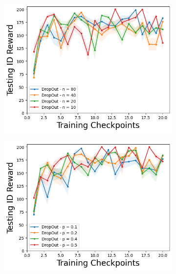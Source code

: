 \begin{figure}
\centering
    \begin{subfigure}{.45\textwidth}
        \includegraphics[width=\textwidth]{sections/011_icml2022/resources/CartPole-v0-mean_reward_-testing-hyperparameter-n_sample-dropout.png}  
    \end{subfigure}
        \begin{subfigure}{.45\textwidth}
        \includegraphics[width=\textwidth]{sections/011_icml2022/resources/CartPole-v0-mean_reward_-testing-hyperparameter-p-dropout.png}  
    \end{subfigure}
    

\end{figure}
